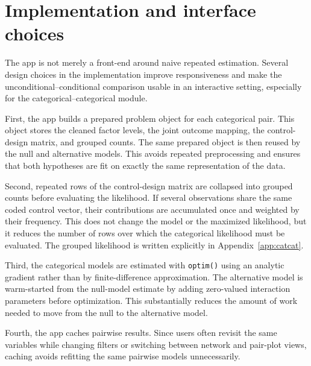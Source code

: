 \documentclass[11pt]{article}
\newcommand{\code}[1]{\texttt{#1}}
\begin{document}
\section{Implementation and interface choices}
\label{sec:implementation}

The app is not merely a front-end around naive repeated estimation. Several
design choices in the implementation improve responsiveness and make the
unconditional--conditional comparison usable in an interactive setting,
especially for the categorical--categorical module.

First, the app builds a prepared problem object for each categorical pair. This
object stores the cleaned factor levels, the joint outcome mapping, the
control-design matrix, and grouped counts. The same prepared object is then
reused by the null and alternative models. This avoids repeated preprocessing
and ensures that both hypotheses are fit on exactly the same representation of
the data.

Second, repeated rows of the control-design matrix are collapsed into grouped
counts before evaluating the likelihood. If several observations share the same
coded control vector, their contributions are accumulated once and weighted by
their frequency. This does not change the model or the maximized likelihood, but
it reduces the number of rows over which the categorical likelihood must be
evaluated. The grouped likelihood is written explicitly in
Appendix~\ref{app:catcat}.

Third, the categorical models are estimated with \code{optim()} using an
analytic gradient rather than by finite-difference approximation. The
alternative model is warm-started from the null-model estimate by adding
zero-valued interaction parameters before optimization. This substantially
reduces the amount of work needed to move from the null to the alternative
model.

Fourth, the app caches pairwise results. Since users often revisit the same
variables while changing filters or switching between network and pair-plot
views, caching avoids refitting the same pairwise models unnecessarily.
\end{document}
